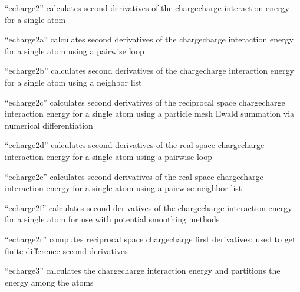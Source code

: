 \documentclass[letterpaper,11pt,english]{sphinxmanual}
\begin{document}
\sphinxAtStartPar
{}

\sphinxAtStartPar
“echarge2” calculates second derivatives of the charge\sphinxhyphen{}charge interaction energy for a single atom

\sphinxAtStartPar
{}

\sphinxAtStartPar
“echarge2a” calculates second derivatives of the charge\sphinxhyphen{}charge interaction energy for a single atom using a pairwise loop

\sphinxAtStartPar
{}

\sphinxAtStartPar
“echarge2b” calculates second derivatives of the charge\sphinxhyphen{}charge interaction energy for a single atom using a neighbor list

\sphinxAtStartPar
{}

\sphinxAtStartPar
“echarge2c” calculates second derivatives of the reciprocal space charge\sphinxhyphen{}charge interaction energy for a single atom using a particle mesh Ewald summation via numerical differentiation

\sphinxAtStartPar
{}

\sphinxAtStartPar
“echarge2d” calculates second derivatives of the real space charge\sphinxhyphen{}charge interaction energy for a single atom using a pairwise loop

\sphinxAtStartPar
{}

\sphinxAtStartPar
“echarge2e” calculates second derivatives of the real space charge\sphinxhyphen{}charge interaction energy for a single atom using a pairwise neighbor list

\sphinxAtStartPar
{}

\sphinxAtStartPar
“echarge2f” calculates second derivatives of the charge\sphinxhyphen{}charge interaction energy for a single atom for use with potential smoothing methods

\sphinxAtStartPar
{}

\sphinxAtStartPar
“echarge2r” computes reciprocal space charge\sphinxhyphen{}charge first derivatives; used to get finite difference second derivatives

\sphinxAtStartPar
{}

\sphinxAtStartPar
“echarge3” calculates the charge\sphinxhyphen{}charge interaction energy and partitions the energy among the atoms
\end{document}
